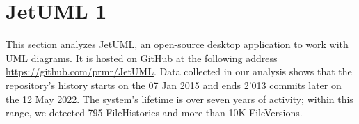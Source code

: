 
\section{JetUML 1}
This section analyzes JetUML, an open-source desktop application to work with UML diagrams. It is hosted on GitHub at the following address \url{https://github.com/prmr/JetUML}. Data collected in our analysis shows that the repository's history starts on the 07 Jan 2015 and ends 2'013 commits later on the 12 May 2022. The system's lifetime is over seven years of activity; within this range, we detected 795 FileHistories and more than 10K FileVersions.

